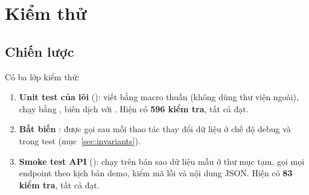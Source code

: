 \chapter{Kiểm thử}\label{chap:testing}

\section{Chiến lược}
Có ba lớp kiểm thử:
\begin{enumerate}
  \item \textbf{Unit test của lõi} (): viết bằng macro  thuần (không dùng thư viện ngoài), chạy bằng , biên dịch với . Hiện có \textbf{596 kiểm tra}, tất cả đạt.
  \item \textbf{Bất biến} : được gọi sau mỗi thao tác thay đổi dữ liệu ở chế độ debug và trong test (mục~\ref{sec:invariants}).
  \item \textbf{Smoke test API} (): chạy  trên bản sao dữ liệu mẫu ở thư mục tạm, gọi mọi endpoint theo kịch bản demo, kiểm mã lỗi và nội dung JSON. Hiện có \textbf{83 kiểm tra}, tất cả đạt.
\end{enumerate}

